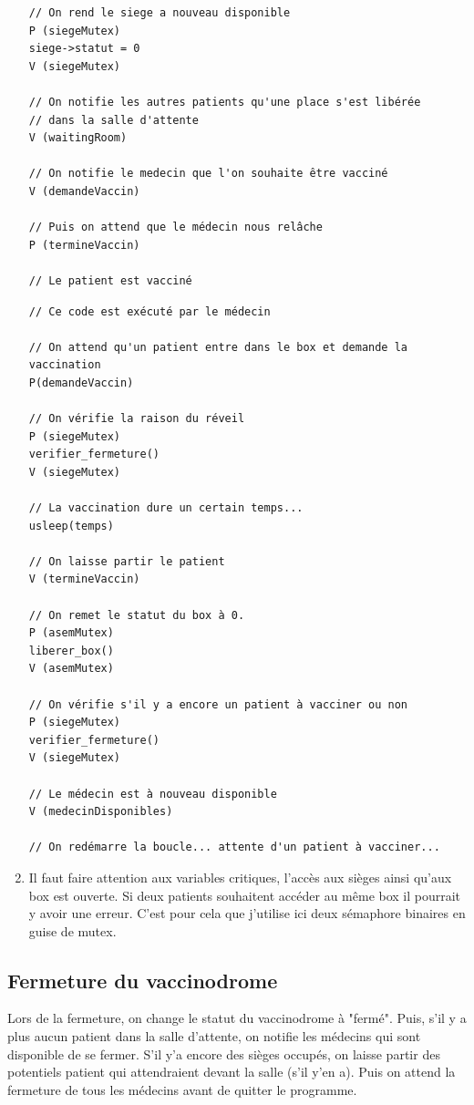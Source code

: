 \documentclass[a4paper]{article}
\begin{document}
\begin{enumerate}
\begin{verbatim}
// On rend le siege a nouveau disponible
P (siegeMutex)
siege->statut = 0
V (siegeMutex)

// On notifie les autres patients qu'une place s'est libérée
// dans la salle d'attente
V (waitingRoom)

// On notifie le medecin que l'on souhaite être vacciné
V (demandeVaccin)

// Puis on attend que le médecin nous relâche
P (termineVaccin)

// Le patient est vacciné
    \end{verbatim}
    \newpage

    \begin{verbatim}
// Ce code est exécuté par le médecin

// On attend qu'un patient entre dans le box et demande la vaccination
P(demandeVaccin)

// On vérifie la raison du réveil
P (siegeMutex)
verifier_fermeture()
V (siegeMutex)

// La vaccination dure un certain temps...
usleep(temps)

// On laisse partir le patient
V (termineVaccin)

// On remet le statut du box à 0.
P (asemMutex)
liberer_box()
V (asemMutex)

// On vérifie s'il y a encore un patient à vacciner ou non
P (siegeMutex)
verifier_fermeture()
V (siegeMutex)

// Le médecin est à nouveau disponible
V (medecinDisponibles)

// On redémarre la boucle... attente d'un patient à vacciner...

    \end{verbatim}

    \item Il faut faire attention aux variables critiques, l'accès aux sièges ainsi qu'aux box est ouverte. Si deux patients souhaitent accéder au même box il pourrait y avoir une erreur. C'est pour cela que j'utilise ici deux sémaphore binaires en guise de mutex.
  \end{enumerate}
  \newpage

  \subsection{Fermeture du vaccinodrome}

  Lors de la fermeture, on change le statut du vaccinodrome à "fermé".
  Puis, s'il y a plus aucun patient dans la salle d'attente, on notifie les médecins qui sont disponible de se fermer. S'il y'a encore des sièges occupés, on laisse partir des potentiels patient qui attendraient devant la salle (s'il y'en a). Puis on attend la fermeture de tous les médecins avant de quitter le programme.
\end{document}
